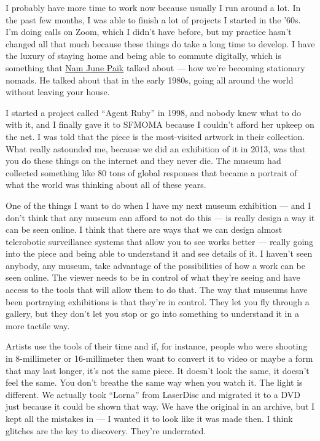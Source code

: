 I probably have more time to work now because usually I run around a
lot. In the past few months, I was able to finish a lot of projects I
started in the '60s. I'm doing calls on Zoom, which I didn't have
before, but my practice hasn't changed all that much because these
things do take a long time to develop. I have the luxury of staying home
and being able to commute digitally, which is something that
\href{https://www.nytimes.com/2006/01/31/arts/design/nam-june-paik-73-dies-pioneer-of-video-art-whose-work-broke.html}{Nam
June Paik} talked about --- how we're becoming stationary nomads. He
talked about that in the early 1980s, going all around the world without
leaving your house.

I started a project called ``Agent Ruby'' in 1998, and nobody knew what
to do with it, and I finally gave it to SFMOMA because I couldn't afford
her upkeep on the net. I was told that the piece is the most-visited
artwork in their collection. What really astounded me, because we did an
exhibition of it in 2013, was that you do these things on the internet
and they never die. The museum had collected something like 80 tons of
global responses that became a portrait of what the world was thinking
about all of these years.

One of the things I want to do when I have my next museum exhibition ---
and I don't think that any museum can afford to not do this --- is
really design a way it can be seen online. I think that there are ways
that we can design almost telerobotic surveillance systems that allow
you to see works better --- really going into the piece and being able
to understand it and see details of it. I haven't seen anybody, any
museum, take advantage of the possibilities of how a work can be seen
online. The viewer needs to be in control of what they're seeing and
have access to the tools that will allow them to do that. The way that
museums have been portraying exhibitions is that they're in control.
They let you fly through a gallery, but they don't let you stop or go
into something to understand it in a more tactile way.

Artists use the tools of their time and if, for instance, people who
were shooting in 8-millimeter or 16-millimeter then want to convert it
to video or maybe a form that may last longer, it's not the same piece.
It doesn't look the same, it doesn't feel the same. You don't breathe
the same way when you watch it. The light is different. We actually took
``Lorna'' from LaserDisc and migrated it to a DVD just because it could
be shown that way. We have the original in an archive, but I kept all
the mistakes in --- I wanted it to look like it was made then. I think
glitches are the key to discovery. They're underrated.

